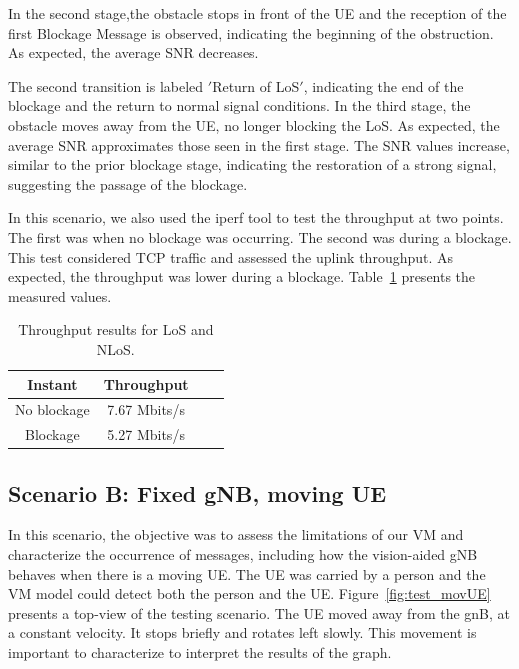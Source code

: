 In the second stage,the obstacle stops in front of the UE and the reception of the first Blockage Message is observed, indicating the beginning of the obstruction.
As expected, the average SNR decreases.

The second transition is labeled \('\)Return of LoS\('\), indicating the end of the blockage and the return to normal signal conditions.
In the third stage, the obstacle moves away from the UE, no longer blocking the LoS\@.
As expected, the average SNR approximates those seen in the first stage.
The SNR values increase, similar to the prior blockage stage, indicating the restoration of a strong signal, suggesting the passage of the blockage.

In this scenario, we also used the iperf tool to test the throughput at two points.
The first was when no blockage was occurring.
The second was during a blockage.
This test considered TCP traffic and assessed the uplink throughput.
As expected, the throughput was lower during a blockage.
Table~\ref{tab:iperf} presents the measured values.


\begin{table}[h]
    \centering %
    \begin{tabular}{|c|c|c|c|}
        \hline
        \textbf{Instant} & \textbf{Throughput} \\ \hline
        No blockage & 7.67 Mbits/s \\ \hline
        Blockage   &  5.27 Mbits/s \\ \hline
    \end{tabular}
    \caption{Throughput results for LoS and NLoS.} %
    \label{tab:iperf} %
\end{table}


\subsection{Scenario B: Fixed gNB, moving UE}\label{subsec:scenario-0.1:-fixed-gnb-moving-ue}

In this scenario, the objective was to assess the limitations of our VM and characterize the occurrence of messages, including how the vision-aided gNB behaves when there is a moving UE\@.
The UE was carried by a person and the VM model could detect both the person and the UE\@.
Figure~\ref{fig:test_movUE} presents a top-view of the testing scenario.
The UE moved away from the gnB, at a constant velocity.
It stops briefly and rotates left slowly.
This movement is important to characterize to interpret the results of the graph.

